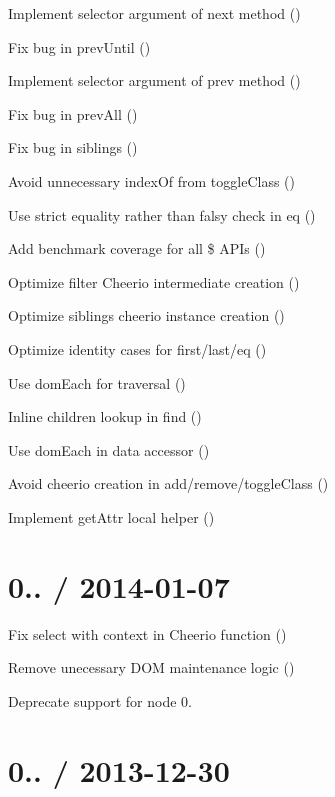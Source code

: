 \begin{DoxyItemize}
\item Implement {\ttfamily selector} argument of {\ttfamily next} method ()
\item Fix bug in {\ttfamily prev\+Until} ()
\item Implement {\ttfamily selector} argument of {\ttfamily prev} method ()
\item Fix bug in {\ttfamily prev\+All} ()
\item Fix bug in {\ttfamily siblings} ()
\item Avoid unnecessary index\+Of from toggle\+Class ()
\item Use strict equality rather than falsy check in eq ()
\item Add benchmark coverage for all \$ A\+P\+Is ()
\item Optimize filter Cheerio intermediate creation ()
\item Optimize siblings cheerio instance creation ()
\item Optimize identity cases for first/last/eq ()
\item Use dom\+Each for traversal ()
\item Inline children lookup in find ()
\item Use dom\+Each in data accessor ()
\item Avoid cheerio creation in add/remove/toggle\+Class ()
\item Implement get\+Attr local helper ()
\end{DoxyItemize}

\section*{0.. / 2014-\/01-\/07 }


\begin{DoxyItemize}
\item Fix select with context in Cheerio function ()
\item Remove unecessary D\+OM maintenance logic ()
\item Deprecate support for node 0.
\end{DoxyItemize}

\section*{0.. / 2013-\/12-\/30 }



